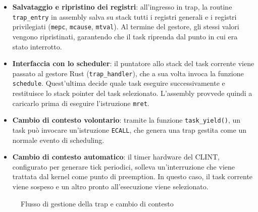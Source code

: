 \documentclass[italian, Lau, oneside]{sapthesis} %
\begin{document}
\begin{itemize}
    \item \textbf{Salvataggio e ripristino dei registri}: all’ingresso in trap, la routine \texttt{trap\_entry} in assembly salva su stack tutti i registri generali e i registri privilegiati (\texttt{mepc}, \texttt{mcause}, \texttt{mtval}). Al termine del gestore, gli stessi valori vengono ripristinati, garantendo che il task riprenda dal punto in cui era stato interrotto.
    \item \textbf{Interfaccia con lo scheduler}: il puntatore allo stack del task corrente viene passato al gestore Rust (\texttt{trap\_handler}), che a sua volta invoca la funzione \texttt{schedule}. Quest’ultima decide quale task eseguire successivamente e restituisce lo stack pointer del task selezionato. L’assembly provvede quindi a caricarlo prima di eseguire l’istruzione \texttt{mret}.
    \item \textbf{Cambio di contesto volontario}: tramite la funzione \texttt{task\_yield()}, un task può invocare un’istruzione \texttt{ECALL}, che genera una trap gestita come un normale evento di scheduling.
    \item \textbf{Cambio di contesto automatico}: il timer hardware del CLINT, configurato per generare tick periodici, solleva un’interruzione che viene trattata dal kernel come punto di preemption. In questo caso, il task corrente viene sospeso e un altro pronto all’esecuzione viene selezionato.
\end{itemize}

\begin{figure}[H]
\centering
{}

\caption{Flusso di gestione della trap e cambio di contesto}
\label{fig:trap-flow}
\end{figure}
\end{document}

